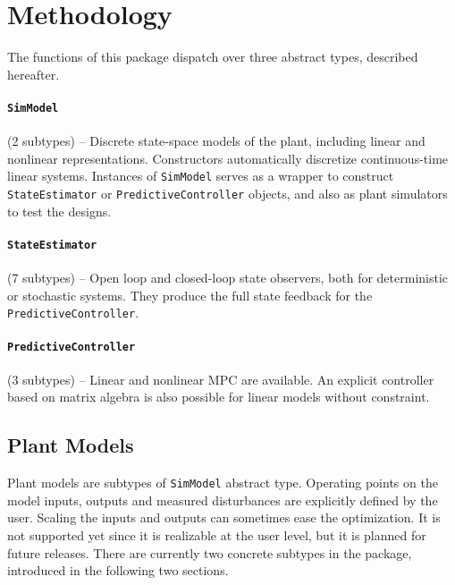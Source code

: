 
\section{Methodology}

The functions of this package dispatch over three abstract types, described hereafter.

\paragraph{\textnormal{\texttt{SimModel}}} (2 subtypes) -- Discrete state-space models of the plant, including linear and nonlinear representations. Constructors automatically discretize continuous-time linear systems. Instances of \texttt{SimModel} serves as a wrapper to construct \texttt{StateEstimator} or \texttt{PredictiveController} objects, and also as plant simulators to test the designs.

\paragraph{\textnormal{\texttt{StateEstimator}}} (7 subtypes) -- Open loop and closed-loop state observers, both for deterministic or stochastic systems. They produce the full state feedback for the \texttt{PredictiveController}.

\paragraph{\texttt{PredictiveController}} (3 subtypes)  -- Linear and nonlinear MPC are available. An explicit controller based on matrix algebra is also possible for linear models without constraint.

\subsection{Plant Models}

Plant models are subtypes of \texttt{SimModel} abstract type. Operating points on the model inputs, outputs and measured disturbances are explicitly defined by the user. Scaling the inputs and outputs can sometimes ease the optimization. It is not supported yet since it is realizable at the user level, but it is planned for future releases. There are currently two concrete subtypes in the package, introduced in the following two sections. 


